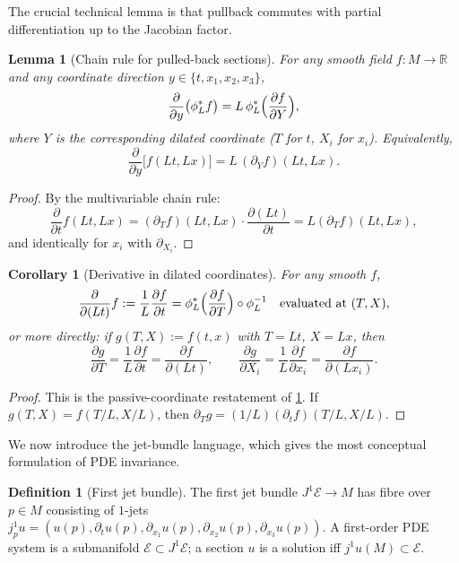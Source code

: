 \documentclass[11pt]{article}
\newtheorem{lemma}[theorem]{Lemma}
\newtheorem{corollary}[theorem]{Corollary}
\theoremstyle{definition}
\newtheorem{definition}[theorem]{Definition}
\theoremstyle{remark}
\newcommand{\R}{\mathbb{R}}
\newcommand{\E}{\mathcal{E}}
\begin{document}
The crucial technical lemma is that pullback commutes with partial
differentiation up to the Jacobian factor.

\begin{lemma}[Chain rule for pulled-back sections]
\label{lem:chain}
For any smooth field $f:M\to\R$ and any coordinate direction
$y\in\{t,x_1,x_2,x_3\}$,
\[
\frac{\partial}{\partial y}\bigl(\phi_L^*f\bigr)
=L\,\phi_L^*\Bigl(\frac{\partial f}{\partial Y}\Bigr),
\]
where $Y$ is the corresponding dilated coordinate ($T$ for $t$, $X_i$ for
$x_i$).  Equivalently,
\[
\frac{\partial}{\partial y}\bigl[f(Lt,Lx)\bigr]
=L\,(\partial_Y f)(Lt,Lx).
\]
\end{lemma}

\begin{proof}
By the multivariable chain rule:
\[
\frac{\partial}{\partial t}f(Lt,Lx)
=(\partial_T f)(Lt,Lx)\cdot\frac{\partial(Lt)}{\partial t}
=L(\partial_T f)(Lt,Lx),
\]
and identically for $x_i$ with $\partial_{X_i}$.
\end{proof}

\begin{corollary}[Derivative in dilated coordinates]
\label{cor:scaled-deriv}
For any smooth $f$,
\[
\frac{\partial}{\partial(Lt)}f
:=\frac{1}{L}\frac{\partial f}{\partial t}
=\phi_L^*\Bigl(\frac{\partial f}{\partial T}\Bigr)\circ\phi_L^{-1}
\quad\text{evaluated at }(T,X),
\]
or more directly: if $g(T,X):=f(t,x)$ with $T=Lt$, $X=Lx$, then
\[
\frac{\partial g}{\partial T}=\frac{1}{L}\frac{\partial f}{\partial t}
=\frac{\partial f}{\partial(Lt)},\qquad
\frac{\partial g}{\partial X_i}=\frac{1}{L}\frac{\partial f}{\partial x_i}
=\frac{\partial f}{\partial(Lx_i)}.
\]
\end{corollary}

\begin{proof}
This is the passive-coordinate restatement of \ref{lem:chain}.  If
$g(T,X)=f(T/L,X/L)$, then $\partial_T g=(1/L)(\partial_t f)(T/L,X/L)$.
\end{proof}

We now introduce the jet-bundle language, which gives the most conceptual
formulation of PDE invariance.

\begin{definition}[First jet bundle]
The first jet bundle $J^1\E\to M$ has fibre over $p\in M$ consisting of
$1$-jets $j^1_p u=(u(p),\partial_t u(p),\partial_{x_1}u(p),\partial_{x_2}u(p),
\partial_{x_3}u(p))$.  A first-order PDE system is a submanifold
$\mathcal E\subset J^1\E$; a section $u$ is a solution iff $j^1u(M)\subset
\mathcal E$.
\end{definition}
\end{document}
